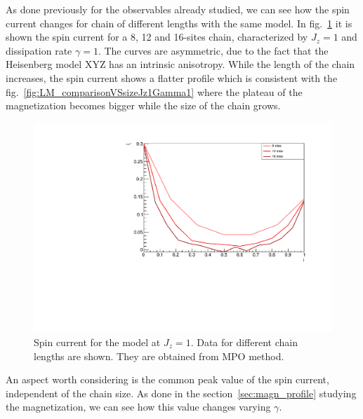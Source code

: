 As done previously for the observables already studied, we can see how the spin current changes for chain of different lengths with the same model. In fig.~\ref{fig:NORM_SpinCurr_comparisonVSsize} it is shown the spin current for a 8, 12 and 16-sites chain, characterized by $J_z = 1$ and dissipation rate $\gamma = 1$. The curves are asymmetric, due to the fact that the Heisenberg model XYZ has an intrinsic anisotropy. While the length of the chain increases, the spin current shows a flatter profile which is consistent with the fig.~\ref{fig:LM_comparisonVSsizeJz1Gamma1} where the plateau of the magnetization becomes bigger while the size of the chain grows.

\begin{figure}[H]
    \centering
    \includegraphics[scale=0.7]{Figures/NORM_SpinCurr_comparisonVSsize.pdf}
    \caption{Spin current for the model at $J_z = 1$. Data for different chain lengths are shown. They are obtained from MPO method.}
    \label{fig:NORM_SpinCurr_comparisonVSsize}
\end{figure}

An aspect worth considering is the common peak value of the spin current, independent of the chain size. As done in the section~\ref{sec:magn_profile} studying the magnetization, we can see how this value changes varying $\gamma$. 

